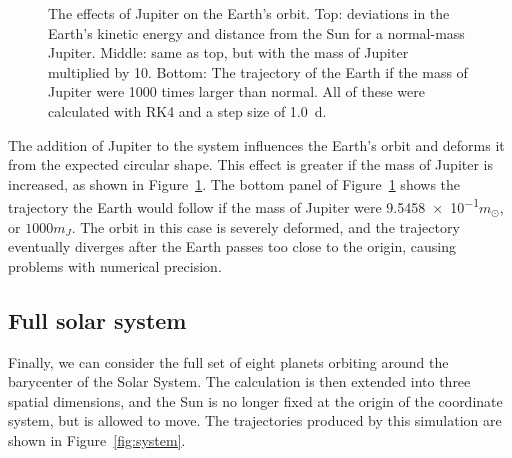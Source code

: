 \documentclass[aps,prc,reprint,nobalancelastpage]{revtex4-1}
\newcommand{\sun}[0]{\ensuremath{\odot}}
\begin{document}
\begin{figure}
            \caption{The effects of Jupiter on the Earth's orbit. Top: deviations in the Earth's kinetic energy and distance from the Sun for a normal-mass Jupiter. Middle: same as top, but with the mass of Jupiter multiplied by 10. Bottom: The trajectory of the Earth if the mass of Jupiter were 1000 times larger than normal. All of these were calculated with RK4 and a step size of \SI{1.0}{d}.}
            \label{fig:jupiter}
        \end{figure}

        The addition of Jupiter to the system influences the Earth's orbit and deforms it from the expected circular shape. This effect is greater if the mass of Jupiter is increased, as shown in Figure~\ref{fig:jupiter}. The bottom panel of Figure~\ref{fig:jupiter} shows the trajectory the Earth would follow if the mass of Jupiter were \num{9.5458e-1}{$m_\sun$}, or $1000 m_J$. The orbit in this case is severely deformed, and the trajectory eventually diverges after the Earth passes too close to the origin, causing problems with numerical precision.

    \subsection{Full solar system}
    \label{sub:full}

        Finally, we can consider the full set of eight planets orbiting around the barycenter of the Solar System. The calculation is then extended into three spatial dimensions, and the Sun is no longer fixed at the origin of the coordinate system, but is allowed to move. The trajectories produced by this simulation are shown in Figure~\ref{fig:system}.
\end{document}
